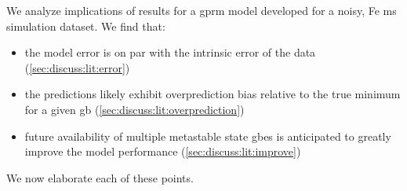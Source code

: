 \documentclass[final,twocolumn,12pt]{elsarticle}
\begin{document}
%	
We analyze implications of results for a \gls{gprm} model developed for a noisy, Fe \gls{ms} simulation dataset.
	We find that:
	\begin{itemize}
		\item the model error is on par with the intrinsic error of the data (\cref{sec:discuss:lit:error})
		\item the predictions likely exhibit overprediction bias relative to the true minimum for a given \gls{gb} (\cref{sec:discuss:lit:overprediction})
		\item future availability of multiple metastable state \glspl{gbe} is anticipated to greatly improve the model performance (\cref{sec:discuss:lit:improve})
	\end{itemize}
	We now elaborate each of these points.
%	
%	
\end{document}
